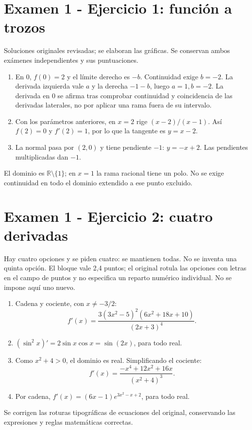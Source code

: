 \documentclass[11pt]{article}
\begin{document}
\section*{Examen 1 - Ejercicio 1: función a trozos}
Soluciones originales revisadas; se elaboran las gráficas. Se conservan ambos exámenes independientes y sus puntuaciones.
\begin{enumerate}[label=(\alph*)]
\item En 0, $f(0)=2$ y el límite derecho es $-b$. Continuidad exige $b=-2$. La derivada izquierda vale $a$ y la derecha $-1-b$, luego $\boxed{a=1,b=-2}$. La derivada en 0 se afirma tras comprobar continuidad y coincidencia de las derivadas laterales, no por aplicar una rama fuera de su intervalo.
\item Con los parámetros anteriores, en $x=2$ rige $(x-2)/(x-1)$. Así $f(2)=0$ y $f'(2)=1$, por lo que la tangente es $\boxed{y=x-2}$.
\item La normal pasa por $(2,0)$ y tiene pendiente $-1$: $\boxed{y=-x+2}$. Las pendientes multiplicadas dan $-1$.
\end{enumerate}
El dominio es $\mathbb R\setminus\{1\}$; en $x=1$ la rama racional tiene un polo. No se exige continuidad en todo el dominio extendido a ese punto excluido.
\clearpage
\section*{Examen 1 - Ejercicio 2: cuatro derivadas}
Hay cuatro opciones y se piden cuatro: se mantienen todas. No se inventa una quinta opción. El bloque vale 2,4 puntos; el original rotula las opciones con letras en el campo de puntos y no especifica un reparto numérico individual. No se impone aquí uno nuevo.
\begin{enumerate}[label=(\alph*)]
\item Cadena y cociente, con $x\ne-3/2$:
\[
f'(x)=\boxed{\frac{3(3x^2-5)^2(6x^2+18x+10)}{(2x+3)^4}}.
\]
\item $\boxed{(\sin^2x)'=2\sin x\cos x=\sin(2x)}$, para todo real.
\item Como $x^2+4>0$, el dominio es real. Simplificando el cociente:
\[
f'(x)=\boxed{\frac{-x^4+12x^2+16x}{(x^2+4)^3}}.
\]
\item Por cadena, $\boxed{f'(x)=(6x-1)e^{3x^2-x+2}}$, para todo real.
\end{enumerate}
Se corrigen las roturas tipográficas de ecuaciones del original, conservando las expresiones y reglas matemáticas correctas.
\clearpage
\end{document}
